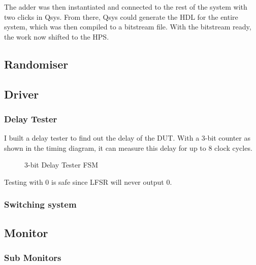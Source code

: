 The adder was then instantiated and connected to the rest of the system with two clicks in Qsys.
From there, Qsys could generate the HDL for the entire system, which was then compiled to a bitstream file.
With the bitstream ready, the work now shifted to the HPS.

\subsection{Randomiser}

\subsection{Driver}

\subsubsection{Delay Tester}

I built a delay tester to find out the delay of the DUT.
With a 3-bit counter as shown in the timing diagram, it can measure this delay for up to 8 clock cycles.

\begin{figure}[ht]
  \centering
  
  \caption{3-bit Delay Tester FSM}
  \label{DelayTester}
\end{figure}
Testing with 0 is safe since LFSR will never output 0.

\subsubsection{Switching system}

\subsection{Monitor}
\subsubsection{Sub Monitors}

